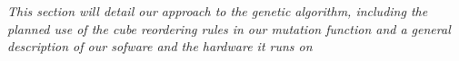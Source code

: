 
\emph{This section will detail our approach to the genetic algorithm, 
including the planned use of the cube reordering rules in our mutation function
and a general description of our sofware and the hardware it runs on}